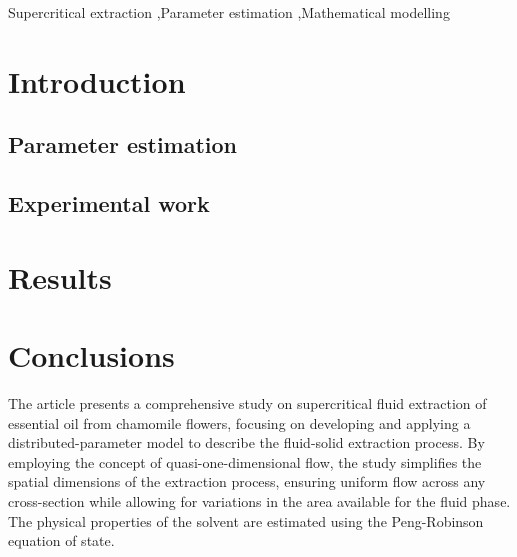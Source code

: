 \documentclass[a4paper,fleqn]{cas-dc}
\begin{document}
\begin{keywords}
Supercritical extraction \sep Parameter estimation \sep Mathematical modelling
\end{keywords}

\maketitle


\section{Introduction}




\subsection{Parameter estimation} \label{CH: Parameter_estimation}


\subsection{Experimental work}


\section{Results}


\section{Conclusions} \label{CH: Conclusion}

The article presents a comprehensive study on supercritical fluid extraction of essential oil from chamomile flowers, focusing on developing and applying a distributed-parameter model to describe the fluid-solid extraction process. By employing the concept of quasi-one-dimensional flow, the study simplifies the spatial dimensions of the extraction process, ensuring uniform flow across any cross-section while allowing for variations in the area available for the fluid phase. The physical properties of the solvent are estimated using the Peng-Robinson equation of state.
\end{document}
